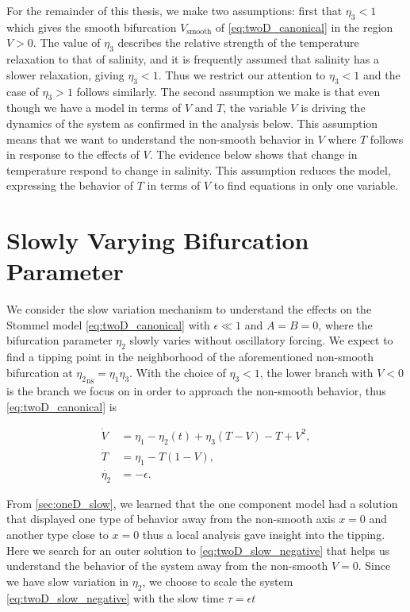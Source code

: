 \indent For the remainder of this thesis, we make two assumptions: first that $\eta_3<1$ which gives the smooth bifurcation $V_{\text{smooth}}$ of \eqref{eq:twoD_canonical} in the region $V>0$. The value of $\eta_3$ describes the relative strength of the temperature relaxation to that of salinity, and it is frequently assumed that salinity has a slower relaxation, giving $\eta_3<1$. Thus we restrict our attention to $\eta_3<1$ and the case of $\eta_3>1$ follows similarly. The second assumption we make is that even though we have a model in terms of $V$ and $T$, the variable $V$ is driving the dynamics of the system as confirmed in the analysis below. This assumption means that we want to understand the non-smooth behavior in $V$ where $T$ follows in response to the effects of $V$. The evidence below shows that change in temperature respond to change in salinity. This assumption reduces the model, expressing the behavior of $T$ in terms of $V$ to find equations in only one variable.

\section{Slowly Varying Bifurcation Parameter}
\label{sec:twoD_slow}

We consider the slow variation mechanism to understand the effects on the Stommel model \eqref{eq:twoD_canonical} with $\epsilon\ll 1$ and $A=B=0$, where the bifurcation parameter $\eta_2$ slowly varies without oscillatory forcing. We expect to find a tipping point in the neighborhood of the aforementioned non-smooth bifurcation at ${\eta_2}_{\text{ns}}=\eta_1\eta_3$. With the choice of $\eta_3<1$, the lower branch with $V<0$ is the branch we focus on in order to approach the non-smooth behavior, thus \eqref{eq:twoD_canonical} is

\begin{equation}\label{eq:twoD_slow_negative}
 \begin{aligned}
  \dot{V} & = \eta_1-\eta_2(t)+\eta_3(T-V)-T+V^2, \\
  \dot{T} & = \eta_1-T(1-V), \\
 \dot{\eta_2} & = -\epsilon.
 \end{aligned}
\end{equation}

\indent From \autoref{sec:oneD_slow}, we learned that the one component model had a solution that displayed one type of behavior away from the non-smooth axis $x=0$ and another type close to $x=0$ thus a local analysis gave insight into the tipping. Here we search for an outer solution to \eqref{eq:twoD_slow_negative} that helps us understand the behavior of the system away from the non-smooth $V=0$. Since we have slow variation in $\eta_2$, we choose to scale the system \eqref{eq:twoD_slow_negative} with the slow time $\tau=\epsilon t$

